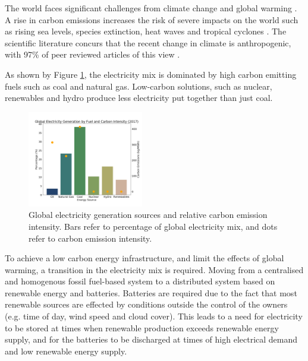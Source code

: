 
The world faces significant challenges from climate change and global warming \cite{Masson-Delmotte2018}. A rise in carbon emissions increases the risk of severe impacts on the world such as rising sea levels, species extinction, heat waves and tropical cyclones \cite{IPCC2014}. The scientific literature concurs that the recent change in climate is anthropogenic, with 97\% of peer reviewed articles of this view \cite{Cook2013}.  

As shown by Figure \ref{fig:fuel_emissions_market_share}, the electricity mix is dominated by high carbon emitting fuels such as coal and natural gas. Low-carbon solutions, such as nuclear, renewables and hydro  produce less electricity put together than just coal.



\begin{figure}
	\begin{center}

		\includegraphics[width=0.45\textwidth]{figures/elec_gen_carbon.png}
		\caption{Global electricity generation sources and relative carbon emission intensity. Bars refer to percentage of global electricity mix, and dots refer to carbon emission intensity. ~\cite{BP2018,Hall1983}}
		\label{fig:fuel_emissions_market_share}
	\end{center}
\end{figure}


To achieve a low carbon energy infrastructure, and limit the effects of global warming, a transition in the electricity mix is required. Moving from a centralised and homogenous fossil fuel-based system to a distributed system based on renewable energy and batteries. Batteries are required due to the fact that most renewable sources are effected by conditions outside the control of the owners (e.g. time of day, wind speed and cloud cover). This leads to a need for electricity to be stored at times when renewable production exceeds renewable energy supply, and for the batteries to be discharged at times of high electrical demand and low renewable energy supply. 

